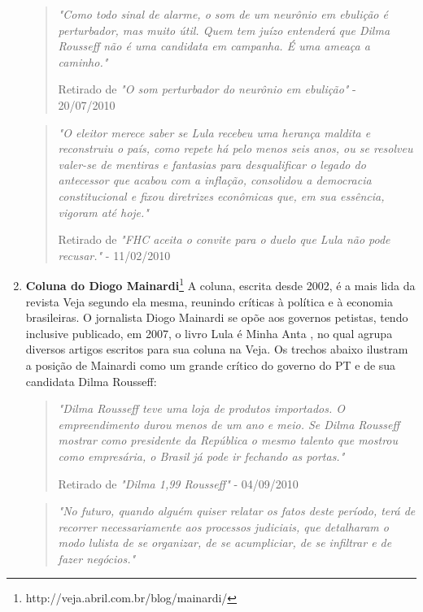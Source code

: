 \begin{enumerate}
\begin{quote}

\emph{"Como todo sinal de alarme, o som de um neurônio em ebulição é  perturbador, mas muito útil. Quem tem juízo entenderá que Dilma Rousseff não é uma candidata em campanha. É uma ameaça a caminho."}

{\small Retirado de \emph{"O som perturbador do neurônio em ebulição"} - 20/07/2010}

\end{quote}

\begin{quote}

\emph{"O eleitor merece saber se Lula recebeu uma herança maldita e reconstruiu o país, como repete há pelo menos seis anos, ou se resolveu valer-se de mentiras e fantasias para desqualificar o legado do antecessor que acabou com a inflação, consolidou a democracia constitucional e fixou diretrizes econômicas que, em sua essência, vigoram até hoje."}

{\small Retirado de \emph{"FHC aceita o convite para o duelo que Lula não pode recusar."} - 11/02/2010}
\end{quote}

\item \textbf{Coluna do Diogo Mainardi}\footnote{http://veja.abril.com.br/blog/mainardi/} A coluna, escrita desde 2002, é a mais lida da revista Veja segundo ela mesma, reunindo críticas à política e à economia brasileiras. O jornalista Diogo Mainardi se opõe aos governos petistas, tendo inclusive publicado, em 2007, o livro Lula é Minha Anta \cite{lula-anta}, no qual agrupa diversos artigos escritos para sua coluna na Veja. Os trechos abaixo ilustram a posição de Mainardi como um grande crítico do governo do PT e de sua candidata Dilma Rousseff:

\begin{quote}

\emph{"Dilma Rousseff teve uma loja de produtos importados. O empreendimento durou menos de um ano e meio. Se Dilma Rousseff mostrar como presidente da República o mesmo talento que mostrou como empresária, o Brasil já pode ir fechando as portas."}

{\small Retirado de \emph{"Dilma 1,99 Rousseff"} - 04/09/2010}
\end{quote}  

\begin{quote}

\emph{"No futuro, quando alguém quiser relatar os fatos deste período, terá de recorrer necessariamente aos processos judiciais, que detalharam o modo lulista de se organizar, de se acumpliciar, de se infiltrar e de fazer negócios."}


\end{quote}
\end{enumerate}
